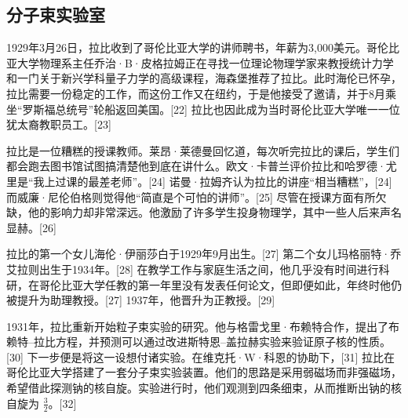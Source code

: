 \subsection{分子束实验室}
1929年3月26日，拉比收到了哥伦比亚大学的讲师聘书，年薪为3,000美元。哥伦比亚大学物理系主任乔治·B·皮格拉姆正在寻找一位理论物理学家来教授统计力学和一门关于新兴学科量子力学的高级课程，海森堡推荐了拉比。此时海伦已怀孕，拉比需要一份稳定的工作，而这份工作又在纽约，于是他接受了邀请，并于8月乘坐“罗斯福总统号”轮船返回美国。[22] 拉比也因此成为当时哥伦比亚大学唯一一位犹太裔教职员工。[23]

拉比是一位糟糕的授课教师。莱昂·莱德曼回忆道，每次听完拉比的课后，学生们都会跑去图书馆试图搞清楚他到底在讲什么。欧文·卡普兰评价拉比和哈罗德·尤里是“我上过课的最差老师”。[24] 诺曼·拉姆齐认为拉比的讲座“相当糟糕”，[24] 而威廉·尼伦伯格则觉得他“简直是个可怕的讲师”。[25] 尽管在授课方面有所欠缺，他的影响力却非常深远。他激励了许多学生投身物理学，其中一些人后来声名显赫。[26]

拉比的第一个女儿海伦·伊丽莎白于1929年9月出生。[27] 第二个女儿玛格丽特·乔艾拉则出生于1934年。[28] 在教学工作与家庭生活之间，他几乎没有时间进行科研，在哥伦比亚大学任教的第一年里没有发表任何论文，但即便如此，年终时他仍被提升为助理教授。[27] 1937年，他晋升为正教授。[29]

1931年，拉比重新开始粒子束实验的研究。他与格雷戈里·布赖特合作，提出了布赖特–拉比方程，并预测可以通过改进斯特恩–盖拉赫实验来验证原子核的性质。[30] 下一步便是将这一设想付诸实验。在维克托·W·科恩的协助下，[31] 拉比在哥伦比亚大学搭建了一套分子束实验装置。他们的思路是采用弱磁场而非强磁场，希望借此探测钠的核自旋。实验进行时，他们观测到四条细束，从而推断出钠的核自旋为 $\frac{3}{2}$。[32]
